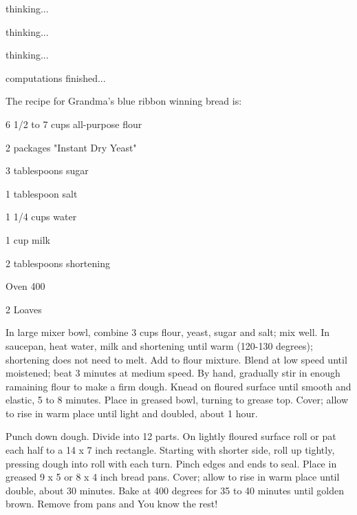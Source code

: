 \documentclass[white]{guildcamp3}
\begin{document}
\name{\wEndWorldSix{}} %

thinking...

thinking...

thinking...

computations finished...

The recipe for Grandma's blue ribbon winning bread is:

6 1/2 to 7 cups all-purpose flour

2 packages "Instant Dry Yeast"

3 tablespoons sugar

1 tablespoon salt

1 1/4 cups water

1 cup milk

2 tablespoons shortening

Oven 400

2 Loaves

In large mixer bowl, combine 3 cups flour, yeast, sugar and salt; 
mix well. In saucepan, heat water, milk and shortening until warm
(120-130 degrees); shortening does not need to melt. Add to flour
mixture. Blend at low speed until moistened; beat 3 minutes at 
medium speed. By hand, gradually stir in enough ramaining flour
to make a firm dough. Knead on floured surface until smooth and 
elastic, 5 to 8 minutes. Place in greased bowl, turning to 
grease top. Cover; allow to rise in warm place until light and 
doubled, about 1 hour. 

Punch down dough. Divide into 12 parts. On lightly floured surface
roll or pat each half to a 14 x 7 inch rectangle.  Starting with
shorter side, roll up tightly, pressing dough into roll with each
turn. Pinch edges and ends to seal. Place in greased 9 x 5 or
8 x 4 inch bread pans. Cover; allow to rise in warm place until 
double, about 30 minutes. Bake at 400 degrees for 35 to 40 minutes 
until golden brown. Remove from pans and You know the rest!  
\end{document}
